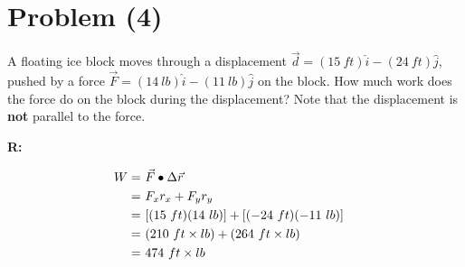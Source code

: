 \section{Problem (4)}

	A floating ice block moves through a displacement $\vec{d} = (15 \ ft)\hat{i} - (24 \ ft)\hat{j}$, pushed by a force $\vec{F} = (14 \ lb)\hat{i} - (11 \ lb)\hat{j}$ on the block. How much work does the force do on the block during the displacement? Note that the displacement is \textbf{not} parallel to the force.

	\textbf{R:}

	\begin{align}
		W = \ &\vec{F} \bullet \Delta \vec{r}& \notag \\
		= \ &F_{x}r_{x} + F_{y}r_{y}& \notag \\
		= \ &[(15 \ ft)(14 \ lb)] + [(-24 \ ft)(-11 \ lb)]& \notag \\
		= \ &(210 \ ft \times lb) + (264 \ ft \times lb)& \notag \\
		= \ &474 \ ft \times lb&
	\end{align}
